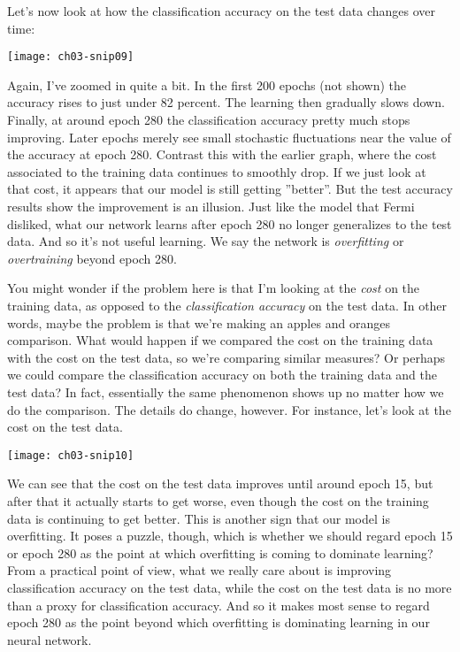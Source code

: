 Let's now look at how the classification accuracy on the test data changes over time:
\begin{marginfigure}
\texttt{[image: ch03-snip09]}
\end{marginfigure}

Again, I've zoomed in quite a bit. In the first 200 epochs (not shown) the accuracy rises to just under 82 percent. The learning then gradually slows down. Finally, at around epoch 280 the classification accuracy pretty much stops improving. Later epochs merely see small stochastic fluctuations near the value of the accuracy at epoch 280. Contrast this with the earlier graph, where the cost associated to the training data continues to smoothly drop. If we just look at that cost, it appears that our model is still getting ''better''. But the test accuracy results show the improvement is an illusion. Just like the model that Fermi disliked, what our network learns after epoch 280 no longer generalizes to the test data. And so it's not useful learning. We say the network is \textit{overfitting} or \textit{overtraining} beyond epoch 280.

You might wonder if the problem here is that I'm looking at the \textit{cost} on the training data, as opposed to the \textit{classification accuracy} on the test data. In other words, maybe the problem is that we're making an apples and oranges comparison. What would happen if we compared the cost on the training data with the cost on the test data, so we're comparing similar measures? Or perhaps we could compare the classification accuracy on both the training data and the test data? In fact, essentially the same phenomenon shows up no matter how we do the comparison. The details do change, however. For instance, let's look at the cost on the test data.
\begin{marginfigure}
\texttt{[image: ch03-snip10]}
\end{marginfigure}
We can see that the cost on the test data improves until around epoch 15, but after that it actually starts to get worse, even though the cost on the training data is continuing to get better. This is another sign that our model is overfitting. It poses a puzzle, though, which is whether we should regard epoch 15 or epoch 280 as the point at which overfitting is coming to dominate learning? From a practical point of view, what we really care about is improving classification accuracy on the test data, while the cost on the test data is no more than a proxy for classification accuracy. And so it makes most sense to regard epoch 280 as the point beyond which overfitting is dominating learning in our neural network.


